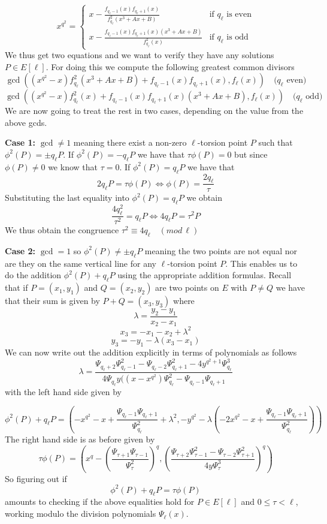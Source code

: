 $$
x^{q^2} = \begin{cases}
           x - \frac{f_{q_\ell-1}(x) f_{q_\ell+1}(x)}{f_{q_\ell}^2 (x^3+Ax+B)} & \text{if } q_\ell \text{ is even} \\
	   x - \frac{f_{q_\ell-1}(x) f_{q_\ell+1}(x) (x^3+Ax+B)}{f_{q_\ell}^2(x)} & \text{if } q_\ell \text{ is odd} 
          \end{cases}
$$
We thus get two equations and we want to verify they have any solutions $P \in E[\ell]$. For
doing this we compute the following greatest common divisors
$$ \gcd((x^{q^2} - x)f_{q_\ell}^2 (x^3+Ax+B)+f_{q_\ell-1}(x) f_{q_\ell+1}(x), f_\ell(x)) \quad (q_\ell \text{ even)}$$
$$ \gcd((x^{q^2} - x)f_{q_\ell}^2(x)+f_{q_\ell-1}(x) f_{q_\ell+1}(x) (x^3+Ax+B), f_\ell(x)) \quad (q_\ell \text{ odd)}$$
We are now going to treat the rest in two cases, depending on the value from the above gcds.

\textbf{Case 1:} $\gcd \neq 1$ meaning there exist a non-zero $\ell$-torsion point $P$ such that $\phi^2(P) = \pm q_\ell P$.
If $\phi^2 (P) = -q_\ell P$ we have that $\tau \phi(P) = 0$ but since $\phi(P) \neq 0$ we know that $\tau = 0$.
If $\phi^2(P) = q_\ell P$ we have that 
$$ 2 q_\ell P = \tau \phi(P) \Leftrightarrow \phi(P) = \frac{2 q_\ell}{\tau} $$
Substituting the last equality into $\phi^2(P) = q_\ell P$ we obtain
$$ \frac{4 q_\ell^2}{\tau^2} = q_\ell P \Leftrightarrow 4 q_\ell P = \tau^2 P $$
We thus obtain the congruence $\tau^2 \equiv 4q_\ell \quad (mod\, \ell)$

\textbf{Case 2:} $\gcd = 1$ so $\phi^2(P) \neq \pm q_\ell P$ meaning the two points are 
not equal nor are they on the same vertical line for any $\ell$-torsion point $P$. 
This enables us to do the addition $\phi^2(P) + q_\ell P$ using the appropriate addition formulas.
Recall that if $P = (x_1, y_1)$ and $Q = (x_2, y_2)$ are two points on $E$ with
$P \neq Q$ we have that their sum is given by $P+Q = (x_3, y_3)$ where
$$ \lambda = \frac{y_2 - y_1}{x_2 - x_1} $$
$$ x_3 = -x_1 - x_2 + \lambda^2 $$
$$ y_3 = -y_1 -\lambda(x_3 - x_1) $$
We can now write out the addition explicitly in terms of polynomials as follows
$$ \lambda = \frac{\Psi_{q_\ell+2} \Psi_{q_\ell-1}^2 - \Psi_{q_\ell-2}\Psi_{q_\ell+1}^2 - 4y^{q^2+1}\Psi_{q_\ell}^3}
		  {4\Psi_{q_\ell} y ((x-x^{q^2})\Psi_{q_\ell}^2 - \Psi_{q_\ell-1}\Psi_{q_\ell+1}} $$
with the left hand side given by

$$\phi^2 (P) + q_\ell P = \left(-x^{q^2}-x+\frac{\Psi_{q_\ell-1}\Psi_{q_\ell+1}}{\Psi_{q_\ell}^2}+\lambda^2,
		     -y^{q^2}-\lambda\left(-2x^{q^2}-x+\frac{\Psi_{q_\ell-1}\Psi_{q_\ell+1}}{\Psi_{q_\ell}^2}\right)\right)$$
The right hand side is as before given by
$$ \tau\phi(P)=\left(x^q-\left(\frac{\Psi_{\tau+1}\Psi_{\tau-1}}{\Psi_\tau^2}\right)^q,\left(\frac{\Psi_{\tau+2}\Psi_{\tau-1}^2 - \Psi_{\tau-2}\Psi_{\tau+1}^2}{4y\Psi_\tau^3}\right)^q\right) $$
So figuring out if $$\phi^2(P) + q_\ell P = \tau \phi(P) $$ amounts to checking if the above equalities
hold for $P\in E[\ell]$ and $0 \leq \tau < \ell$, working modulo the division polynomials $\Psi_\ell(x)$. 
